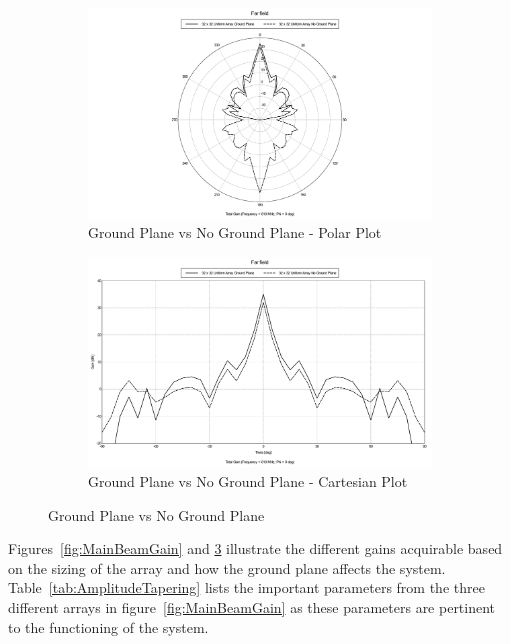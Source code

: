 \documentclass[11pt]{witseiepaper}
\begin{document}
\begin{figure}[htb]
    \centering
    \begin{subfigure}{.5\textwidth}
        \centering
            \includegraphics[width=0.9\linewidth]{GroundPlane-Polar.pdf}
            \caption{Ground Plane vs No Ground Plane - Polar Plot}
            \label{fig:GroundPlane-Polar}
        \end{subfigure}%
        \begin{subfigure}{.5\textwidth}
            \centering
            \includegraphics[width=0.9\linewidth]{GroundPlane-Cartesian.pdf}
            \caption{Ground Plane vs No Ground Plane - Cartesian Plot}
                \label{fig:GroundPlane-Cartesian}
            \end{subfigure}
\caption{Ground Plane vs No Ground Plane}
\label{fig:GroundPlane}
\end{figure}

Figures~\ref{fig:MainBeamGain} and \ref{fig:GroundPlane} illustrate the different gains acquirable based on the sizing of the array and how the ground plane affects the system.
Table~\ref{tab:AmplitudeTapering} lists the important parameters from the three different arrays in figure~\ref{fig:MainBeamGain} as these parameters are pertinent to the functioning of the system.
\end{document}
